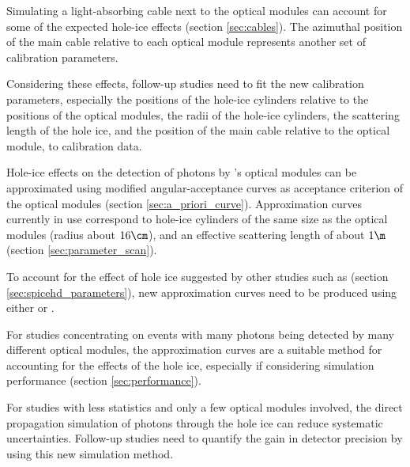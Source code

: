 Simulating a light-absorbing cable next to the optical modules can account for some of the expected hole-ice effects (section \ref{sec:cables}). The azimuthal position of the main cable relative to each optical module represents another set of calibration parameters.

Considering these effects, follow-up studies need to fit the new calibration parameters, especially the positions of the hole-ice cylinders relative to the positions of the optical modules, the radii of the hole-ice cylinders, the scattering length of the hole ice, and the position of the main cable relative to the optical module, to calibration data.

Hole-ice effects on the detection of photons by \icecube's optical modules can be approximated using modified angular-acceptance curves as acceptance criterion of the optical modules (section \ref{sec:a_priori_curve}). Approximation curves currently in use correspond to hole-ice cylinders of the same size as the optical modules (radius about $16\cm$), and an effective scattering length of about $1\m$ (section \ref{sec:parameter_scan}).

To account for the effect of hole ice suggested by other studies such as  (section \ref{sec:spicehd_parameters}), new approximation curves need to be produced using either \ppc or \clsim.

For studies concentrating on events with many photons being detected by many different optical modules, the approximation curves are a suitable method for accounting for the effects of the hole ice, especially if considering simulation performance (section \ref{sec:performance}).

For studies with less statistics and only a few optical modules involved, the direct propagation simulation of photons through the hole ice can reduce systematic uncertainties. Follow-up studies need to quantify the gain in detector precision by using this new simulation method.

